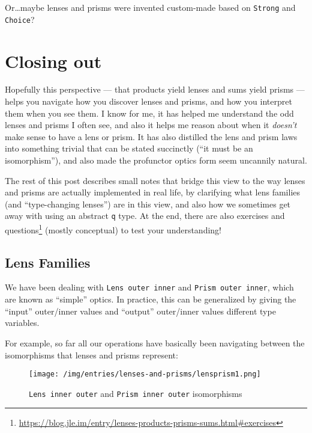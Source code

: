 \documentclass[]{article}
\renewcommand{\href}[2]{#2\footnote{\url{#1}}}
\begin{document}
Or\ldots{}maybe lenses and prisms were invented custom-made based on
\texttt{Strong} and \texttt{Choice}?

\hypertarget{closing-out}{%
\section{Closing out}\label{closing-out}}

Hopefully this perspective --- that products yield lenses and sums yield prisms
--- helps you navigate how you discover lenses and prisms, and how you interpret
them when you see them. I know for me, it has helped me understand the odd
lenses and prisms I often see, and also it helps me reason about when it
\emph{doesn't} make sense to have a lens or prism. It has also distilled the
lens and prism laws into something trivial that can be stated succinctly (``it
must be an isomorphism''), and also made the profunctor optics form seem
uncannily natural.

The rest of this post describes small notes that bridge this view to the way
lenses and prisms are actually implemented in real life, by clarifying what lens
families (and ``type-changing lenses'') are in this view, and also how we
sometimes get away with using an abstract \texttt{q} type. At the end, there are
also
\href{https://blog.jle.im/entry/lenses-products-prisms-sums.html\#exercises}{exercises
and questions} (mostly conceptual) to test your understanding!

\hypertarget{lens-families}{%
\subsection{Lens Families}\label{lens-families}}

We have been dealing with \texttt{Lens\textquotesingle{}\ outer\ inner} and
\texttt{Prism\textquotesingle{}\ outer\ inner}, which are known as ``simple''
optics. In practice, this can be generalized by giving the ``input'' outer/inner
values and ``output'' outer/inner values different type variables.

For example, so far all our operations have basically been navigating between
the isomorphisms that lenses and prisms represent:

\begin{figure}
\centering
\texttt{[image: /img/entries/lenses-and-prisms/lensprism1.png]}
\caption{\texttt{Lens\textquotesingle{}\ inner\ outer} and
\texttt{Prism\textquotesingle{}\ inner\ outer} isomorphisms}
\end{figure}
\end{document}
